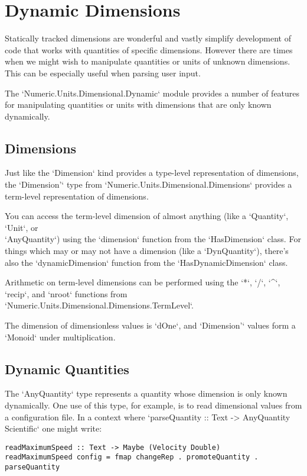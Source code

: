 \documentclass[11pt]{report}
\begin{document}
\chapter{Dynamic Dimensions}

Statically tracked dimensions are wonderful and vastly simplify development of code that works with quantities of specific
dimensions. However there are times when we might wish to manipulate quantities or units of unknown dimensions. This can be
especially useful when parsing user input.

The `Numeric.Units.Dimensional.Dynamic` module provides a number of features for manipulating quantities or units with dimensions that are only
known dynamically.

\section{Dimensions}

Just like the `Dimension` kind provides a type-level representation of dimensions, the `Dimension'` type from `Numeric.Units.Dimensional.Dimensions`
provides a term-level representation of dimensions.

You can access the term-level dimension of almost anything (like a `Quantity`, `Unit`, or \\
`AnyQuantity`) using the `dimension` function from the `HasDimension` class. For things
which may or may not have a dimension (like a `DynQuantity`), there's also the `dynamicDimension`
function from the `HasDynamicDimension` class.

Arithmetic on term-level dimensions can be performed using the `*`, `/`, `^`, `recip`, and `nroot` functions from `Numeric.Units.Dimensional.Dimensions.TermLevel`.

The dimension of dimensionless values is `dOne`, and `Dimension'` values form a `Monoid` under multiplication.

\section{Dynamic Quantities}

The `AnyQuantity` type represents a quantity whose dimension is only known dynamically. One use of this
type, for example, is to read dimensional values from a configuration file. In a context where
`parseQuantity :: Text -> AnyQuantity Scientific` one might write:

\begin{lstlisting}
readMaximumSpeed :: Text -> Maybe (Velocity Double)
readMaximumSpeed config = fmap changeRep . promoteQuantity . parseQuantity
\end{lstlisting}
\end{document}
